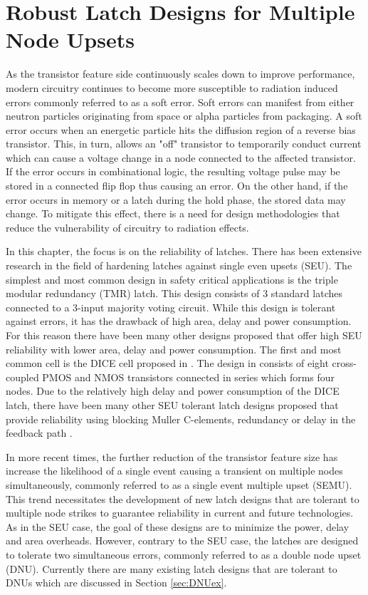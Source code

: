 \chapter{Robust Latch Designs for Multiple Node Upsets}

As the transistor feature side continuously scales down to improve performance, modern circuitry continues to become more susceptible to radiation induced errors commonly referred to as a soft error. Soft errors can manifest from either neutron particles originating from space or alpha particles from packaging. A soft error occurs when an energetic particle hits the diffusion region of a reverse bias transistor. This, in turn, allows an "off" transistor to temporarily conduct current which can cause a voltage change in a node connected to the affected transistor. If the error occurs in combinational logic, the resulting voltage pulse may be stored in a connected flip flop thus causing an error. On the other hand, if the error occurs in memory or a latch during the hold phase, the stored data may change. To mitigate this effect, there is a need for design methodologies that reduce the vulnerability of circuitry to radiation effects.

In this chapter, the focus is on the reliability of latches. There has been extensive research in the field of hardening latches against single even upsets (SEU). The simplest and most common design in safety critical applications is the triple modular redundancy (TMR) latch. This design consists of 3 standard latches connected to a 3-input majority voting circuit. While this design is tolerant against errors, it has the drawback of high area, delay and power consumption. For this reason there have been many other designs proposed that offer high SEU reliability with lower area, delay and power consumption. The first and most common cell is the DICE cell proposed in \cite{DICE}. The design in \cite{DICE} consists of eight cross-coupled PMOS and NMOS transistors connected in series which forms four nodes. Due to the relatively high delay and power consumption of the DICE latch, there have been many other SEU tolerant latch designs proposed that provide reliability using blocking Muller C-elements, redundancy or delay in the feedback path \cite{HIPER, FERST, Hazucha, SEMULatch, Multivdd, BISER, NicoFeedback}.

In more recent times, the further reduction of the transistor feature size has increase the likelihood of a single event causing a transient on multiple nodes simultaneously, commonly referred to as a single event multiple upset (SEMU). This trend necessitates the development of new latch designs that are tolerant to multiple node strikes to guarantee reliability in current and future technologies. As in the SEU case, the goal of these designs are to minimize the power, delay and area overheads. However, contrary to the SEU case, the latches are designed to tolerate two simultaneous errors, commonly referred to as a double node upset (DNU). Currently there are many existing latch designs that are tolerant to DNUs which are discussed in Section \ref{sec:DNUex}.   

